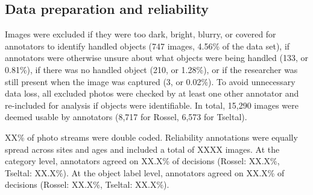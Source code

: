 \documentclass[10pt, letterpaper]{article}
\begin{document}
\hypertarget{data-preparation-and-reliability}{%
\subsection{Data preparation and
reliability}\label{data-preparation-and-reliability}}

Images were excluded if they were too dark, bright, blurry, or covered
for annotators to identify handled objects (747 images, 4.56\% of the
data set), if annotators were otherwise unsure about what objects were
being handled (133, or 0.81\%), if there was no handled object (210, or
1.28\%), or if the researcher was still present when the image was
captured (3, or 0.02\%). To avoid unnecessary data loss, all excluded
photos were checked by at least one other annotator and re-included for
analysis if objects were identifiable. In total, 15,290 images were
deemed usable by annotators (8,717 for Rossel, 6,573 for Tseltal).

XX\% of photo streams were double coded. Reliability annotations were
equally spread across sites and ages and included a total of XXXX
images. At the category level, annotators agreed on XX.X\% of decisions
(Rossel: XX.X\%, Tseltal: XX.X\%). At the object label level, annotators
agreed on XX.X\% of decisions (Rossel: XX.X\%, Tseltal: XX.X\%).

\begin{table}[!ht]

\caption{\label{tab:top-objects}Unique object counts (N) and objects handled by the most children for each category across sites.}
\centering
{}
\end{table}
\end{document}
